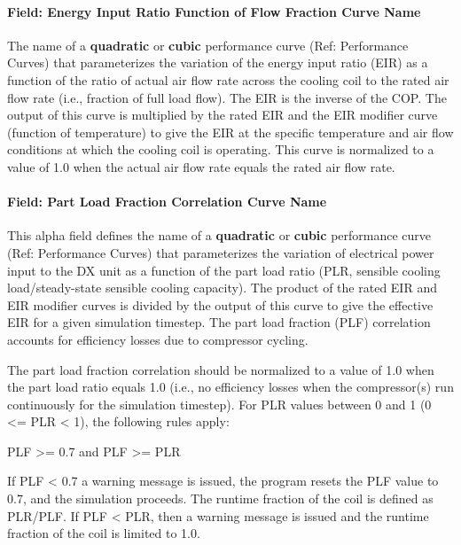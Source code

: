 \paragraph{Field: Energy Input Ratio Function of Flow Fraction Curve Name}\label{field-energy-input-ratio-function-of-flow-fraction-curve-name-2}

The name of a \textbf{quadratic} or \textbf{cubic} performance curve (Ref: Performance Curves) that parameterizes the variation of the energy input ratio (EIR) as a function of the ratio of actual air flow rate across the cooling coil to the rated air flow rate (i.e., fraction of full load flow). The EIR is the inverse of the COP. The output of this curve is multiplied by the rated EIR and the EIR modifier curve (function of temperature) to give the EIR at the specific temperature and air flow conditions at which the cooling coil is operating. This curve is normalized to a value of 1.0 when the actual air flow rate equals the rated air flow rate.

\paragraph{Field: Part Load Fraction Correlation Curve Name}\label{field-part-load-fraction-correlation-curve-name-5}

This alpha field defines the name of a \textbf{quadratic} or \textbf{cubic} performance curve (Ref: Performance Curves) that parameterizes the variation of electrical power input to the DX unit as a function of the part load ratio (PLR, sensible cooling load/steady-state sensible cooling capacity). The product of the rated EIR and EIR modifier curves is divided by the output of this curve to give the effective EIR for a given simulation timestep. The part load fraction (PLF) correlation accounts for efficiency losses due to compressor cycling.

The part load fraction correlation should be normalized to a value of 1.0 when the part load ratio equals 1.0 (i.e., no efficiency losses when the compressor(s) run continuously for the simulation timestep). For PLR values between 0 and 1 (0 \textless{}= PLR \textless{} 1), the following rules apply:

PLF \textgreater{}= 0.7 and PLF \textgreater{}= PLR

If PLF \textless{} 0.7 a warning message is issued, the program resets the PLF value to 0.7, and the simulation proceeds. The runtime fraction of the coil is defined as PLR/PLF. If PLF \textless{} PLR, then a warning message is issued and the runtime fraction of the coil is limited to 1.0.

